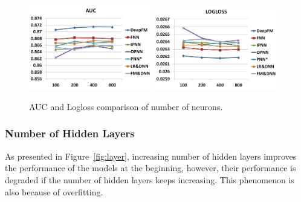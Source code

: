 \begin{figure}[ht]
\setlength{\abovecaptionskip}{0pt}%
\setlength{\belowcaptionskip}{-10pt}
\centering
\begin{minipage}[b]{0.5\textwidth}
\includegraphics[width=0.48\textwidth]{img/neuron-auc.png}
\includegraphics[width=0.48\textwidth]{img/neuron-logloss.png}
\end{minipage}
\caption{\footnotesize{AUC and Logloss comparison of number of neurons.}}\label{fig:neuron}
\end{figure}

\subsubsection{Number of Hidden Layers}\label{sec:exp:hyper:layer}

As presented in Figure~\ref{fig:layer}, increasing number of hidden layers improves the performance of the models at the beginning, however, their performance is degraded if the number of hidden layers keeps increasing. This phenomenon is also because of overfitting.

